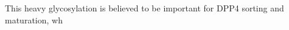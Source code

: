 This heavy glycosylation is believed to be important for DPP4 sorting and maturation, wh\cite{Matter_1991}